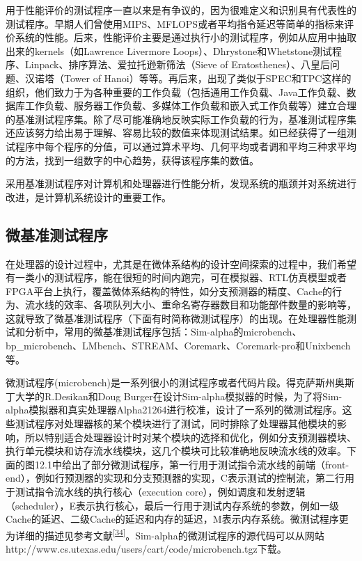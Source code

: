 \documentclass[]{ctexbook}
\begin{document}
用于性能评价的测试程序一直以来是有争议的，因为很难定义和识别具有代表性的测试程序。早期人们曾使用MIPS、MFLOPS或者平均指令延迟等简单的指标来评价系统的性能。后来，性能评价主要是通过执行小的测试程序，例如从应用中抽取出来的kernels（如Lawrence Livermore Loops）、Dhrystone和Whetstone测试程序、Linpack、排序算法、爱拉托逊新筛法（Sieve of Eratosthenes）、八皇后问题、汉诺塔（Tower of Hanoi）等等。再后来，出现了类似于SPEC和TPC这样的组织，他们致力于为各种重要的工作负载（包括通用工作负载、Java工作负载、数据库工作负载、服务器工作负载、多媒体工作负载和嵌入式工作负载等）建立合理的基准测试程序集。除了尽可能准确地反映实际工作负载的行为，基准测试程序集还应该努力给出易于理解、容易比较的数值来体现测试结果。如已经获得了一组测试程序中每个程序的分值，可以通过算术平均、几何平均或者调和平均三种求平均的方法，找到一组数字的中心趋势，获得该程序集的数值。

采用基准测试程序对计算机和处理器进行性能分析，发现系统的瓶颈并对系统进行改进，是计算机系统设计的重要工作。

\hypertarget{ux5faeux57faux51c6ux6d4bux8bd5ux7a0bux5e8f}{%
\subsection{微基准测试程序}\label{ux5faeux57faux51c6ux6d4bux8bd5ux7a0bux5e8f}}

在处理器的设计过程中，尤其是在微体系结构的设计空间探索的过程中，我们希望有一类小的测试程序，能在很短的时间内跑完，可在模拟器、RTL仿真模型或者FPGA平台上执行，覆盖微体系结构的特性，如分支预测器的精度、Cache的行为、流水线的效率、各项队列大小、重命名寄存器数目和功能部件数量的影响等，这就导致了微基准测试程序（下面有时简称微测试程序）的出现。在处理器性能测试和分析中，常用的微基准测试程序包括：Sim-alpha的microbench、bp\_microbench、LMbench、STREAM、Coremark、Coremark-pro和Unixbench等。

微测试程序(microbench)是一系列很小的测试程序或者代码片段。得克萨斯州奥斯丁大学的R.Desikan和Doug Burger在设计Sim-alpha模拟器的时候，为了将Sim-alpha模拟器和真实处理器Alpha21264进行校准，设计了一系列的微测试程序。这些测试程序对处理器核的某个模块进行了测试，同时排除了处理器其他模块的影响，所以特别适合处理器设计时对某个模块的选择和优化，例如分支预测器模块、执行单元模块和访存流水线模块，这几个模块可比较准确地反映流水线的效率。下面的图12.1中给出了部分微测试程序，第一行用于测试指令流水线的前端（front-end），例如行预测器的实现和分支预测器的实现，C表示测试的控制流，第二行用于测试指令流水线的执行核心（execution core），例如调度和发射逻辑（scheduler），E表示执行核心，最后一行用于测试内存系统的参数，例如一级Cache的延迟、二级Cache的延迟和内存的延迟，M表示内存系统。微测试程序更为详细的描述见参考文献\textsuperscript{{[}\protect\hyperlink{ref-desikan_sim-alpha_2002}{34}{]}}。Sim-alpha的微测试程序的源代码可以从网站http://www.cs.utexas.edu/users/cart/code/microbench.tgz下载。
\end{document}
